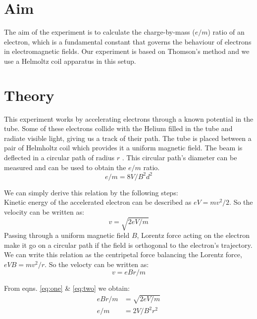 \documentclass[../main.tex]{subfiles}
\begin{document}
\setcounter{page}{21}

\vspace*{1cm}
\section{Aim}
The aim of the experiment is to calculate the charge-by-mass ($e/m$) ratio of an electron, which is a fundamental constant that governs the behaviour of electrons in electromagnetic fields. Our experiment is based on Thomson's method and we use a Helmoltz coil apparatus in this setup.

\section{Theory}
This experiment works by accelerating electrons through a known potential in the tube. Some of these electrons collide with the Helium filled in the tube and radiate visible light, giving us a track of their path. The tube is placed between a pair of Helmholtz coil which provides it a uniform magnetic field. The beam is deflected in a circular path of radius $r$ . This circular path's diameter can be measured and can be used to obtain the $e/m$ ratio.
$$ e/m = 8V/B^2d^2 $$

We can simply derive this relation by the following steps: \\
Kinetic energy of the accelerated electron can be described as $eV = mv^2/2$. So the velocity can be written as:
\begin{equation}
	v = \sqrt{2eV/m}
	\label{eq:one}
\end{equation}
Passing through a uniform magnetic field $B$, Lorentz force acting on the electron make it go on a circular path if the field is orthogonal to the electron's trajectory. We can write this relation as the centripetal force balancing the Lorentz force, $eVB = mv^2/r$. So the velocty can be written as:
\begin{equation}
	v = eBr/m
	\label{eq:two}
\end{equation}

From eqns. \autoref{eq:one} \& \autoref{eq:two} we obtain:
\begin{align}
	eBr/m &= \sqrt{2eV/m} \\
	e/m &= 2V/B^2r^2
\end{align}
\end{document}
